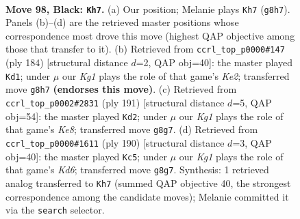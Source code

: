 \documentclass[11pt]{article}
\begin{document}
\clearpage

\begin{figure}[p]\centering
\begin{subfigure}{0.46\textwidth}\centering
\resizebox{\linewidth}{!}{%
\newchessgame
\chessboard[
  setfen={1R4k1/8/8/8/8/7K/5p2/3r4 b - - 11 98},
  showmover=false,
  pgfstyle=straightmove, color=movearrow, markmove={g8-h7}
]}
\caption{}
\end{subfigure}\hfill
\begin{subfigure}{0.46\textwidth}\centering
\resizebox{\linewidth}{!}{%
\newchessgame
\chessboard[
  setfen={1k6/8/8/8/8/2R5/4K2r/8 w - - 16 93},
  showmover=false,
  pgfstyle=straightmove, color=movearrow, markmove={e2-d1}
]}
\caption{}
\end{subfigure}
\\[4pt]
\begin{subfigure}{0.46\textwidth}\centering
\resizebox{\linewidth}{!}{%
\newchessgame
\chessboard[
  setfen={8/7r/8/8/4p3/4P3/6K1/R3k3 b - - 13 96},
  showmover=false,
  pgfstyle=straightmove, color=movearrow, markmove={e1-d2}
]}
\caption{}
\end{subfigure}\hfill
\begin{subfigure}{0.46\textwidth}\centering
\resizebox{\linewidth}{!}{%
\newchessgame
\chessboard[
  setfen={3k4/7R/3K2r1/8/3P4/8/8/8 w - - 19 96},
  showmover=false,
  pgfstyle=straightmove, color=movearrow, markmove={d6-c5}
]}
\caption{}
\end{subfigure}
\caption{\textbf{Move 98, Black: \texttt{Kh7}.} (a) Our position; Melanie plays \texttt{Kh7} (\texttt{g8h7}). Panels (b)--(d) are the retrieved master positions whose correspondence most drove this move (highest QAP objective among those that transfer to it). (b) Retrieved from \texttt{ccrl\_top\_p0000\#147} (ply 184) [structural distance $d$=2, QAP obj=40]: the master played \texttt{Kd1}; under $\mu$ our \emph{Kg1} plays the role of that game's \emph{Ke2}; transferred move \texttt{g8h7} \textbf{(endorses this move)}. (c) Retrieved from \texttt{ccrl\_top\_p0002\#2831} (ply 191) [structural distance $d$=5, QAP obj=54]: the master played \texttt{Kd2}; under $\mu$ our \emph{Kg1} plays the role of that game's \emph{Ke8}; transferred move \texttt{g8g7}. (d) Retrieved from \texttt{ccrl\_top\_p0000\#1611} (ply 190) [structural distance $d$=3, QAP obj=40]: the master played \texttt{Kc5}; under $\mu$ our \emph{Kg1} plays the role of that game's \emph{Kd6}; transferred move \texttt{g8g7}. Synthesis: 1 retrieved analog transferred to \texttt{Kh7} (summed QAP objective 40, the strongest correspondence among the candidate moves); Melanie committed it via the \texttt{search} selector.}
\label{fig:thought-m195}
\end{figure}
\end{document}
